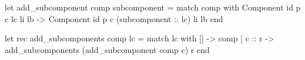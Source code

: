 let add_subcomponent comp subcomponent =
  match comp with
    Component id p c lc li lb -> 
           Component id p c (subcomponent :: lc) li lb
  end

let rec add_subcomponents comp lc =
  match lc with
    []     -> comp 
  | c :: r -> add_subcomponents (add_subcomponent comp c) r
  end 